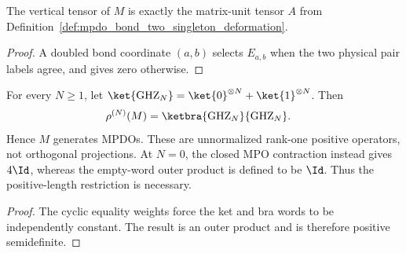 \begin{lemma}%
    \label{thm:mpdo_bond_two_singleton_vertical_identity}
    \leanok
    The vertical tensor of $M$ is exactly the matrix-unit tensor $A$ from
    Definition~\ref{def:mpdo_bond_two_singleton_deformation}.
\end{lemma}
\begin{proof}\leanok
    A doubled bond coordinate $(a,b)$ selects $E_{a,b}$ when the two physical
    pair labels agree, and gives zero otherwise.
\end{proof}

\begin{lemma}%
    \label{thm:mpdo_bond_two_singleton_ambient_ghz}
    \leanok
    For every $N\geq1$, let
    $\ket{\mathrm{GHZ}_N}=\ket{0}^{\otimes N}+\ket{1}^{\otimes N}$.
    Then
    \begin{align}
        \rho^{(N)}(M)
         & =\ketbra{\mathrm{GHZ}_N}{\mathrm{GHZ}_N}.
        \notag
    \end{align}
    Hence $M$ generates MPDOs. These are unnormalized rank-one positive
    operators, not orthogonal projections. At $N=0$, the closed MPO
    contraction instead gives $4\Id$, whereas the empty-word outer product
    is defined to be $\Id$. Thus the positive-length restriction is necessary.
\end{lemma}
\begin{proof}\leanok
    The cyclic equality weights force the ket and bra words to be independently
    constant. The result is an outer product and is therefore positive
    semidefinite.
\end{proof}

